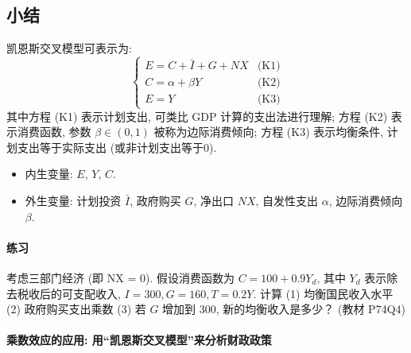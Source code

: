 \documentclass[11pt]{ctexart}
\begin{document}
\subsection*{小结} 

凯恩斯交叉模型可表示为:
\begin{equation*}
\, \begin{cases}
E = C + \bar{I} + G + NX  &\text{(K1)} \\
C = \alpha + \beta Y &\text{(K2)}  \\
E =Y  &\text{(K3)}
\end{cases}  
\end{equation*}
其中方程 (K1) 表示计划支出, 可类比 GDP 计算的支出法进行理解;
方程 (K2) 表示消费函数, 参数 $\beta \in (0,1)$ 被称为边际消费倾向;
方程 (K3) 表示均衡条件, 计划支出等于实际支出 (或非计划支出等于0).

\begin{itemize}
\item 
  内生变量: $E$, $Y$, $C$.
\item 
  外生变量: 计划投资 $\bar{I}$, 政府购买 $G$, 净出口 $NX$, 自发性支出 $\alpha$, 边际消费倾向 $\beta$.  
\end{itemize}

\begin{framed}
\paragraph{练习} 考虑三部门经济  (即 NX = 0).
假设消费函数为 $C = 100 + 0.9 Y_d$, 其中 $Y_d$ 表示除去税收后的可支配收入, $I=300,  G=160,  T=0.2Y$. 计算  (1) 均衡国民收入水平  (2) 政府购买支出乘数  (3) 若 $G$ 增加到 300, 新的均衡收入是多少？  \hfill  (教材 P74Q4)
\end{framed}



\clearpage

\paragraph{乘数效应的应用: 用``凯恩斯交叉模型''来分析财政政策}
\end{document}
